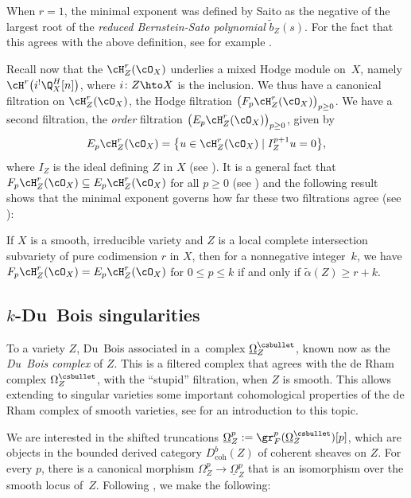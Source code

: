 When $r=1$, the minimal exponent was defined by Saito \cite{Saito_microlocal} as the negative of the largest root of the \emph{reduced Bernstein-Sato polynomial}
$\widetilde{b}_Z(s)$. For the fact that this agrees with the above definition, see for example \cite[Lem.\,5.3 and Cor.\,C]{MP5}.

Recall now that the \DXmodule $\cH^r_Z(\cO_X)$ underlies a mixed Hodge module on~$X$, namely $\cH^r\big(i^!\Q_X^H[n]\big)$, where
$i\colon Z\hto X$ is the inclusion. We thus have a canonical filtration on $\cH^r_Z(\cO_X)$, the Hodge filtration $\big(F_p\cH^r_Z(\cO_X)\big)_{p\geq 0}$.
We have a second filtration, the \emph{order} filtration $\big(E_p\cH^r_Z(\cO_X)\big)_{p\geq 0}$, given by
\[E_p\cH^r_Z(\cO_X)=\big\{u\in\cH^r_Z(\cO_X)\mid I_Z^{p+1}u=0\big\},\]
where $I_Z$ is the ideal defining $Z$ in $X$ (see \cite[Prop.\,3.11]{MP1}).
It is a general fact that $F_p\cH^r_Z(\cO_X)\subseteq E_p\cH^r_Z(\cO_X)$ for all $p\geq 0$
(see \cite[Prop.\,3.4]{MP1}) and the following result shows that the minimal exponent governs how far these two filtrations agree
(see \cite[Th.\,1.3]{CDMO}):

\begin{thm}\label{thm_local_coho}
If $X$ is a smooth, irreducible variety and $Z$ is a local complete intersection subvariety of pure codimension $r$ in $X$, then for a nonnegative integer~$k$, we have
$F_p\cH^r_Z(\cO_X)=E_p\cH^r_Z(\cO_X)$ for $0\leq p\leq k$ if and only if $\widetilde{\alpha}(Z)\geq r+k$.
\end{thm}

\subsection{$k$-Du~Bois singularities}\label{section_k_DuBois}
To a variety $Z$, Du~Bois associated in \cite{DuBois} a~complex $\underline{\Omega}_Z^{\csbullet}$, known now as the
\emph{Du~Bois complex} of $Z$. This is a filtered complex that agrees with the de Rham complex $\Omega_Z^{\csbullet}$, with the ``stupid'' filtration, when $Z$ is smooth.
This allows extending to singular varieties some important cohomological properties of the de Rham complex of smooth varieties, see \cite[Ch.\,7.3]{PetersSteenbrink}
for an introduction to this topic.

We are interested in the shifted truncations $\underline{\Omega}_Z^p:=\gr_F^p(\underline{\Omega}_Z^{\csbullet})[p]$, which are objects in the bounded derived category
$D^b_\mathrm{coh}(Z)$ of coherent sheaves on $Z$.
For every $p$, there is a canonical morphism $\Omega_Z^p\to \underline{\Omega}_Z^p$ that is an isomorphism over the smooth locus of~$Z$. Following
\cite{Saito_et_al}, we make the following:

